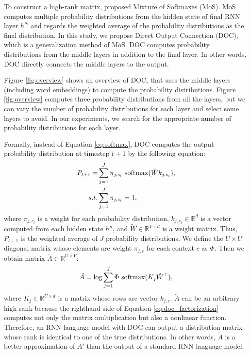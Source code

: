 \documentclass[11pt,a4paper]{article}
\begin{document}
To construct a high-rank matrix,  proposed Mixture of Softmaxes (MoS).
MoS computes multiple probability distributions from the hidden state of final RNN layer $h^N$ and regards the weighted average of the probability distributions as the final distribution.
In this study, we propose Direct Output Connection (DOC), which is a generalization method of MoS.
DOC computes probability distributions from the middle layers in addition to the final layer.
In other words, DOC directly connects the middle layers to the output.


Figure \ref{fig:overview} shows an overview of DOC, that uses the middle layers (including word embeddings) to compute the probability distributions.
Figure \ref{fig:overview} computes three probability distributions from all the layers, but we can vary the number of probability distributions for each layer and select some layers to avoid.
In our experiments, we search for the appropriate number of probability distributions for each layer.


Formally, instead of Equation \ref{eq:softmax}, DOC computes the output probability distribution at timestep $t+1$ by the following equation:
\begin{align}
  P_{t+1} = &\sum_{j=1}^{J} \pi_{j, c_t} \  {\rm softmax} (\tilde{W} k_{j, c_t}), \label{eq:doc} \\
  s.t. &\sum_{j=1}^{J} \pi_{j, c_t} = 1,
\end{align}
where $\pi_{j, c_t}$ is a weight for each probability distribution, $k_{j, c_t} \in \mathbb{R}^{d}$ is a vector computed from each hidden state $h^{n}$, and $\tilde{W} \in \mathbb{R}^{V \times d}$ is a weight matrix.
Thus, $P_{t+1}$ is the weighted average of $J$ probability distributions.
We define the $U \times U$ diagonal matrix whose elements are weight $\pi_{j, c}$ for each context $c$ as $\Phi$.
Then we obtain matrix $\tilde{A} \in \mathbb{R}^{U \times V}$:
\begin{align}
  \tilde{A} = {\rm log} \sum_{j=1}^{J} \Phi \  {\rm softmax}(K_{j} \tilde{W}^\top), \label{eq:doc_factorization}
\end{align}
where $K_{j} \in \mathbb{R}^{U \times d}$ is a matrix whose rows are vector $k_{j, c}$.
$\tilde{A}$ can be an arbitrary high rank because the righthand side of Equation \ref{eq:doc_factorization} computes not only the matrix multiplication but also a nonlinear function.
Therefore, an RNN language model with DOC can output a distribution matrix whose rank is identical to one of the true distributions.
In other words, $\tilde{A}$ is a better approximation of $A'$ than the output of a standard RNN language model.
\end{document}
